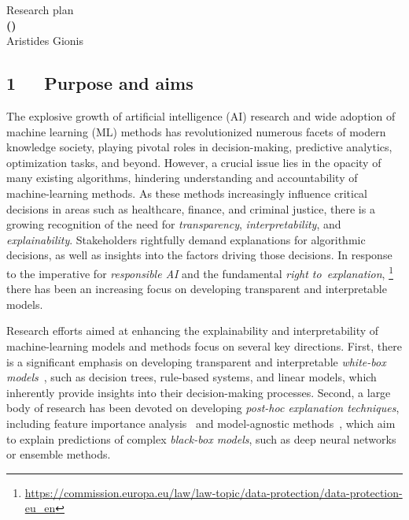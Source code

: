 \documentclass[a4paper,11pt]{article}
\begin{document}
\begin{center} 
{\Large Research plan} \vspace{3mm}\\
{\Large\bf {\proposaltitle} {\sc (}{\acronymtitle}{\sc )}}  \vspace{3mm} \\
{\Large Aristides Gionis} 
\end{center}


\subsection*{1~~~Purpose and aims}


The explosive growth of artificial intelligence (AI) research and wide adoption of machine learning (ML) methods 
has revolutionized numerous facets of modern knowledge society, 
playing pivotal roles in decision-making, predictive analytics, optimization tasks, and beyond. 
However, a crucial issue lies in the opacity of many existing algorithms, 
hindering understanding and accountability of machine-learning methods. 
As these methods increasingly influence critical decisions in areas such as 
healthcare, finance, and criminal justice, 
there is a growing recognition of the need for \emph{transparency}, 
\emph{interpretability}, and \emph{explainability}.
Stakeholders rightfully demand explanations for algorithmic decisions, 
as well as insights into the factors driving those decisions. 
In response to the imperative for \emph{responsible AI} and the fundamental \emph{right to~expla\-na\-tion},%
\!\footnote{\url{https://commission.europa.eu/law/law-topic/data-protection/data-protection-eu_en}}
there has been an increasing focus on developing transparent and interpretable models.

Research efforts aimed at enhancing the explainability and interpretability 
of machine-learning models and methods focus on several key directions. 
First, there is a significant emphasis on developing transparent and interpretable 
\emph{white-box models}~\cite{loyola2019black}, 
such as decision trees, rule-based systems, and linear models, 
which inherently provide insights into their decision-making processes. 
Second, a large body of research has been devoted on developing \emph{post-hoc explanation techniques}, 
including feature importance analysis~\cite{lundberg2017unified} and 
model-agnostic methods~\cite{ribeiro2016model}, 
which aim to explain predictions of complex \emph{black-box models}, 
such as deep neural networks or ensemble methods.
\end{document}
